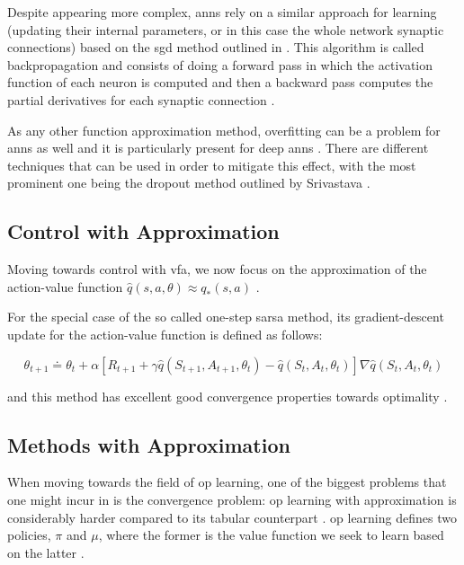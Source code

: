 \documentclass{seal_thesis}
\begin{document}

Despite appearing more complex, \glspl{ann} rely on a similar approach for learning (\ie updating their internal parameters, or in this case the whole network synaptic connections) based on the \gls{sgd} method outlined in  \cite[p. 217]{Sutton2017}. This algorithm is called backpropagation and consists of doing a forward pass in which the activation function of each neuron is computed and then a backward pass computes the partial derivatives for each synaptic connection \cite[p. 218]{Sutton2017}.

As any other function approximation method, overfitting can be a problem for \glspl{ann} as well and it is particularly present for deep \glspl{ann} \cite[p. 218]{Sutton2017}. There are different techniques that can be used in order to mitigate this effect, with the most prominent one being the dropout method outlined by Srivastava \cite{Srivastava2014}.

\subsection{ Control with Approximation}
\label{subsec:onpol_control}

Moving towards control with \gls{vfa}, we now focus on the approximation of the action-value function $\hat{q} (s,a,\theta) \approx q_* (s,a)$ \cite[p. 229]{Sutton2017}.

For the special case of the so called one-step \gls{sarsa} method, its gradient-descent update for the action-value function is defined as follows:

\begin{equation}
	\theta_{t+1} \doteq \theta_t + \alpha [ R_{t+1} + \gamma \hat{q} (S_{t+1}, A_{t+1}, \theta_t) - \hat{q} (S_t, A_t, \theta_t) ] \nabla \hat{q} (S_t, A_t, \theta_t)
\end{equation}

and this method has excellent good convergence properties towards optimality \cite[p. 230]{Sutton2017}.

\subsection{ Methods with Approximation}
\label{subsec:offpol_methods}

When moving towards the field of \gls{op} learning, one of the biggest problems that one might incur in is the convergence problem: \gls{op} learning with approximation is considerably harder compared to its tabular counterpart \cite[p. 243]{Sutton2017}. \gls{op} learning defines two policies, $\pi$ and $\mu$, where the former is the value function we seek to learn based on the latter \cite[p. 243]{Sutton2017}.
\end{document}

